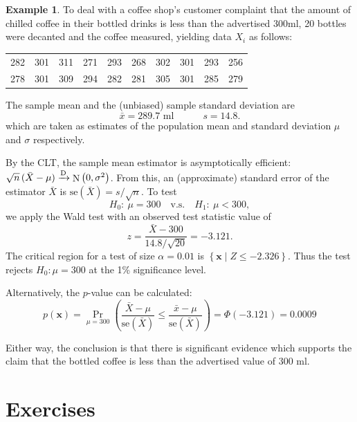 \documentclass[
]{book}
\newcommand{\bx}{{\boldsymbol x}}
\DeclareMathOperator{\N}{N}
\theoremstyle{definition}
\theoremstyle{definition}
\newtheorem{example}{Example}[chapter]
\theoremstyle{definition}
\theoremstyle{definition}
\theoremstyle{remark}
\begin{document}
\begin{example}
\protect\hypertarget{exm:coffee}{}\label{exm:coffee}To deal with a coffee shop's customer complaint that the amount of chilled coffee in their bottled drinks is less than the advertised 300ml, 20 bottles were decanted and the coffee measured, yielding data \(X_i\) as follows:

\begin{longtable}[]{@{}cccccccccc@{}}
\toprule
\endhead
282 & 301 & 311 & 271 & 293 & 268 & 302 & 301 & 293 & 256 \\
278 & 301 & 309 & 294 & 282 & 281 & 305 & 301 & 285 & 279 \\
\bottomrule
\end{longtable}

The sample mean and the (unbiased) sample standard deviation are
\[
\bar x = 289.7 \text{ ml} \hspace{3em} s = 14.8. 
\]
which are taken as estimates of the population mean and standard deviation \(\mu\) and \(\sigma\) respectively.

By the CLT, the sample mean estimator is asymptotically efficient: \(\sqrt{n} \, (\bar X-\mu) \xrightarrow{\text D}\N\left(0, \sigma^2\right)\).
From this, an (approximate) standard error of the estimator \(\bar X\) is \(\text{se}(\bar X)=s/\sqrt n\).
To test
\[
H_0: \ \mu = 300 \hspace{1em}\text{v.s.}\hspace{1em} H_1: \ \mu < 300,
\]
we apply the Wald test with an observed test statistic value of
\[
z = \frac{\bar X - 300}{14.8/\sqrt{20}} = -3.121.
\]
The critical region for a test of size \(\alpha=0.01\) is \(\left\{\bx \mid Z \leq -2.326 \right\}\). Thus the test rejects \(H_0:\mu=300\) at the 1\% significance level.

Alternatively, the \(p\)-value can be calculated:
\[
p(\bx) = \Pr_{\mu=300}\left(\frac{\bar X - \mu}{\text{se}(\bar X)} \leq \frac{\bar x - \mu}{\text{se}(\bar X)}\right) = \Phi\left(-3.121 \right) = 0.0009
\]

Either way, the conclusion is that there is significant evidence which supports the claim that the bottled coffee is less than the advertised value of 300 ml.
\end{example}

\hypertarget{exercises-4}{%
\section{Exercises}\label{exercises-4}}
\end{document}
